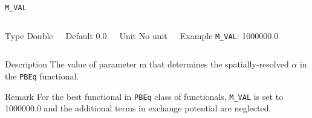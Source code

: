 	
	\begin{frame}[allowframebreaks]{\texttt{M\_VAL}} \label{M_VAL}
		\vspace*{-12pt}
		\begin{columns}
		\begin{block}{Type}
		Double
		\end{block}
		
		\begin{block}{Default}
		 0.0
		\end{block}
		
		\begin{block}{Unit}
		No unit
		\end{block}
		
		\begin{block}{Example}
		\texttt{M\_VAL}: 1000000.0
		\end{block}
		\end{columns}
		
		\begin{block}{Description}
		The value of parameter m that determines the spatially-resolved $\alpha$ in the \texttt{PBEq} functional.
		\end{block}
		
		\begin{block}{Remark}
		For the best functional in \texttt{PBEq} class of functionals, \texttt{M\_VAL} is set to 1000000.0 and the additional terms in exchange potential are neglected.
		\end{block}
		\end{frame}
